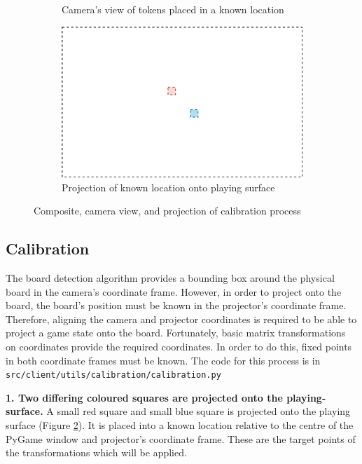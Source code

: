 \documentclass[12pt]{article}
\begin{document}
\begin{figure}[H]
\begin{subfigure}{0.65\textwidth}
        \caption{Camera's view of tokens placed in a known location}
        \label{fig:calibrationb}
    \end{subfigure}
    \begin{subfigure}{0.65\textwidth}
        \includegraphics[width=1\textwidth]{images/figures/fig15c}
        \caption{Projection of known location onto playing surface}
        \label{fig:calibrationc}
    \end{subfigure}
    \caption{Composite, camera view, and projection of calibration process}
    \label{fig:calibration}
\end{figure}

\subsection{Calibration}
The board detection algorithm provides a bounding box around the physical board in the camera's coordinate frame. 
However, in order to project onto the board, the board's position must be known in the projector's coordinate frame. 
Therefore, aligning the camera and projector coordinates is required to be able to project a game state onto the board. 
Fortunately, basic matrix transformations on coordinates provide the required coordinates. 
In order to do this, fixed points in both coordinate frames must be known. 
The code for this process is in\\\texttt{src/client/utils/calibration/calibration.py}

\textbf{1. Two differing coloured squares are projected onto the playing-surface.} 
A small red square and small blue square is projected onto the playing surface (Figure \ref{fig:calibrationc}). 
It is placed into a known location relative to the centre of the PyGame window and projector's coordinate frame. 
These are the target points of the transformations which will be applied.
\end{document}

